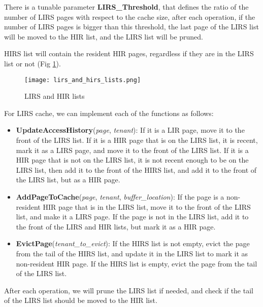 There is a tunable parameter \textbf{LIRS\_Threshold}, that defines the ratio of the number of
LIRS pages with respect to the cache size, after each operation, if the number of LIRS pages is
bigger than this threshold, the last page of the LIRS list will be moved to the HIR list, and
the LIRS list will be pruned.

HIRS list will contain the resident HIR pages, regardless if they are in the LIRS list or not 
(Fig \ref{fig:lirs_and_hirs_lists}).

\begin{figure}[H]
    \centering
    \begin{minipage}{0.5\textwidth}
        \centering
        \texttt{[image: lirs\_and\_hirs\_lists.png]}
        \caption{LIRS and HIR lists}
        \label{fig:lirs_and_hirs_lists}
    \end{minipage}
    \hfill
\end{figure}

For LIRS cache, we can implement each of the functions as follows:

\begin{itemize}
    \item \textbf{UpdateAccessHistory}(\textit{page}, \textit{tenant}): If it is a LIR page, move it
    to the front of the LIRS list. If it is a HIR page that is on the LIRS list, it is recent, mark it 
    as a LIRS page, and move it to the front of the LIRS list. If it is a HIR page that is not on the LIRS
    list, it is not recent enough to be on the LIRS list, then add it to the front of the HIRS list, and 
    add it to the front of the LIRS list, but as a HIR page.
    \item \textbf{AddPageToCache}(\textit{page}, \textit{tenant}, \textit{buffer\_location}): If the page 
    is a non-resident HIR page that is in the LIRS list, move it to the front of the LIRS list, and make it a 
    LIRS page. If the page is not in the LIRS list, add it to the front of the LIRS and HIR lists, but mark it
    as a HIR page.
    \item \textbf{EvictPage}(\textit{tenant\_to\_evict}): If the HIRS list is not empty, evict the page from the 
    tail of the HIRS list, and update it in the LIRS list to mark it as non-resident HIR page. If the HIRS list is
    empty, evict the page from the tail of the LIRS list.
\end{itemize}

After each operation, we will prune the LIRS list if needed, and check if the tail of 
the LIRS list should be moved to the HIR list.

